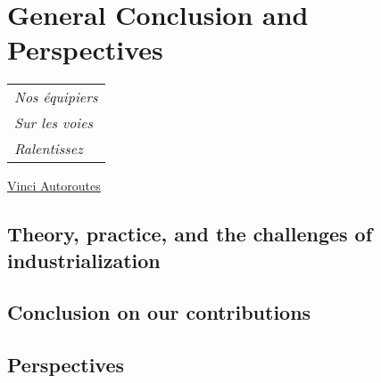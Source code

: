 
\chapter{General Conclusion and Perspectives}
\label{chapter:conclusion}

\begin{flushright}
	\begin{tabular}{@{}l@{}}
		\emph{Nos équipiers}\\
		\emph{\hspace*{1.0cm}Sur les voies}\\
		\emph{\hspace*{0.5cm}Ralentissez}\\
	\end{tabular}

	\href{https://twitter.com/pooredward/status/1273249408231124994}{Vinci Autoroutes}\hspace*{1cm}
\end{flushright}


\section{Theory, practice, and the challenges of industrialization}
\section{Conclusion on our contributions}
\section{Perspectives}
